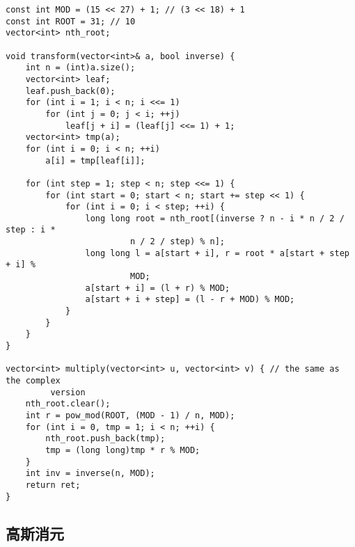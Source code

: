 \documentclass{article}
\begin{document}
\begin{lstlisting}
const int MOD = (15 << 27) + 1; // (3 << 18) + 1
const int ROOT = 31; // 10
vector<int> nth_root;

void transform(vector<int>& a, bool inverse) {
    int n = (int)a.size();
    vector<int> leaf;
    leaf.push_back(0);
    for (int i = 1; i < n; i <<= 1)
        for (int j = 0; j < i; ++j)
            leaf[j + i] = (leaf[j] <<= 1) + 1;
    vector<int> tmp(a);
    for (int i = 0; i < n; ++i)
        a[i] = tmp[leaf[i]];

    for (int step = 1; step < n; step <<= 1) {
        for (int start = 0; start < n; start += step << 1) {
            for (int i = 0; i < step; ++i) {
                long long root = nth_root[(inverse ? n - i * n / 2 / step : i *
                         n / 2 / step) % n];
                long long l = a[start + i], r = root * a[start + step + i] %
                         MOD;
                a[start + i] = (l + r) % MOD;
                a[start + i + step] = (l - r + MOD) % MOD;
            }
        }
    }
}

vector<int> multiply(vector<int> u, vector<int> v) { // the same as the complex
         version
    nth_root.clear();
    int r = pow_mod(ROOT, (MOD - 1) / n, MOD);
    for (int i = 0, tmp = 1; i < n; ++i) {
        nth_root.push_back(tmp);
        tmp = (long long)tmp * r % MOD;
    }
    int inv = inverse(n, MOD);
    return ret;
}
\end{lstlisting}

\subsection{高斯消元}
\end{document}
